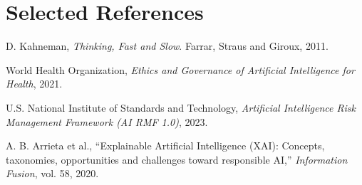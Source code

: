 \documentclass[11pt,a4paper]{article}
\begin{document}
\section*{Selected References}
\begin{enumerate}[label={[\arabic*]},leftmargin=8mm]
  \item D. Kahneman, \emph{Thinking, Fast and Slow}. Farrar, Straus and Giroux, 2011.
  \item World Health Organization, \emph{Ethics and Governance of Artificial Intelligence for Health}, 2021.
  \item U.S. National Institute of Standards and Technology, \emph{Artificial Intelligence Risk Management Framework (AI RMF 1.0)}, 2023.
  \item A. B. Arrieta et al., ``Explainable Artificial Intelligence (XAI): Concepts, taxonomies, opportunities and challenges toward responsible AI,'' \emph{Information Fusion}, vol. 58, 2020.
\end{enumerate}
\end{document}
